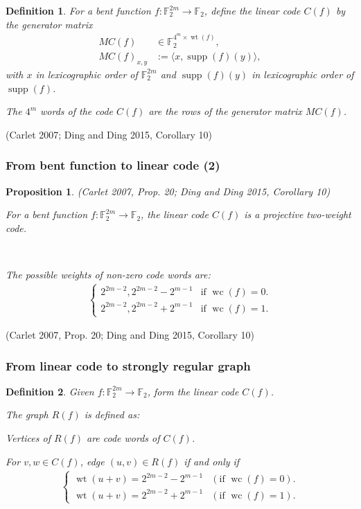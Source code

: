 \documentclass[pdf,sprung,slideColor,nocolorBG]{beamer}
\newenvironment{colortheme}[1]{
\def\ProvidesPackageRCS $##1${\relax}
\renewcommand{\ProcessOptions}{\relax}
\makeatletter

\makeatother
}{}
\newcommand{\slidecite}[1]{\tiny{(#1)}\normalsize{}}
\newcommand{\smallcite}[1]{\small{(#1)}\normalsize{}}
\newcommand{\mb}[1]{\mathbb{#1}}
\newcommand{\To}{\rightarrow}
\newcommand{\support}[1]{\operatorname{supp}\left(#1\right)}
\newcommand{\weight}[1]{\operatorname{wt}\left(#1\right)}
\newcommand{\weightclass}[1]{\operatorname{wc}\left(#1\right)}
\newcommand{\F}{\mb{F}}
\newtheorem{Def}{Definition}
\newtheorem{Proposition}{Proposition}
\begin{document}
\begin{colortheme}{seagull}
\begin{frame}
\begin{Def}
For a bent function $f : \F_2^{2m} \To \F_2$,
define the linear code $C(f)$ by the generator matrix
\begin{align*}
M C(f) &\in \F_2^{4^m \times \weight{f}},
\\
M C(f)_{x,y} &:= \langle x, \support{f}(y) \rangle,
\end{align*}
with $x$ in lexicographic order of $\F_2^{2m}$
and $\support{f}(y)$ in lexicographic order of $\support{f}$.

The $4^m$ words of the code $C(f)$ are the rows of the generator matrix $M C(f)$.
\end{Def}

\slidecite{Carlet 2007; Ding and Ding 2015, Corollary 10}

\end{frame}
\begin{frame}
\frametitle{From bent function to linear code (2)}
\begin{Proposition}
\smallcite{Carlet 2007, Prop. 20; Ding and Ding 2015, Corollary 10}

For a bent function $f : \F_2^{2m} \To \F_2$, the linear code $C(f)$
is a projective two-weight code.

~

The possible weights of non-zero code words are:
\begin{align*}
\begin{cases}
2^{2m-2}, 2^{2m-2} - 2^{m-1} & \text{if~} \weightclass{f}=0.
\\
2^{2m-2}, 2^{2m-2} + 2^{m-1} & \text{if~} \weightclass{f}=1.
\end{cases}
\end{align*}

\end{Proposition}

\slidecite{Carlet 2007, Prop. 20; Ding and Ding 2015, Corollary 10}

\end{frame}

\begin{frame}
\frametitle{From linear code to strongly regular graph}
\begin{Def}
\label{R-f-def}
Given $f : \F_2^{2m} \To \F_2$, form the linear code $C(f)$.

The graph $R(f)$ is defined as:

Vertices of $R(f)$ are code words of $C(f)$.

For $v,w \in C(f)$, edge $(u,v) \in R(f)$ if and only if
\begin{align*}
\begin{cases}
\weight{u+v} = 2^{2m-2} - 2^{m-1} & (\text{if~}\weightclass{f}=0).
\\
\weight{u+v} = 2^{2m-2} + 2^{m-1} & (\text{if~}\weightclass{f}=1).
\end{cases}
\end{align*}


\end{Def}
\end{frame}
\end{colortheme}
\end{document}
